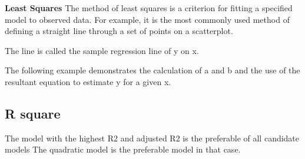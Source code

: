 \documentclass[]{report}
\begin{document}
\textbf{Least Squares}
The method of least squares is a criterion for fitting a specified model to observed data.
For example, it is the most commonly used method of defining a straight line through a set of points on a scatterplot.









The line is called the sample regression line of y on x.

The following example demonstrates the calculation of a and b and the use of the resultant
equation to estimate y for a given x.






\subsection{R square}
The model with the highest R2 and adjusted R2  is the preferable of all candidate models
The quadratic model is the preferable model in that case.





					
\end{document}
